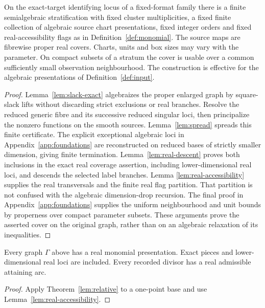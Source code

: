 \begin{theorem}\label{lem:relative}
On the exact-target identifying locus of a fixed-format family there is
a finite semialgebraic stratification with fixed cluster multiplicities,
a fixed finite collection of algebraic source chart presentations, fixed
integer orders and fixed real-accessibility flags as in
Definition~\ref{def:monomial}. The source maps are fibrewise proper real
covers. Charts, units and box sizes may vary with the parameter. On
compact subsets of a stratum the cover is usable over a common
sufficiently small observation neighbourhood. The construction is
effective for the algebraic presentations of Definition~\ref{def:input}.
\end{theorem}
\begin{proof}
Lemma~\ref{lem:slack-exact} algebraizes the proper enlarged graph by
square-slack lifts without discarding strict exclusions or real branches.
Resolve the reduced generic fibre and its successive reduced singular
loci, then principalize the nonzero functions on the smooth sources.
Lemma~\ref{lem:spread} spreads this finite certificate. The explicit
exceptional algebraic loci in Appendix~\ref{app:foundations} are
reconstructed on reduced bases of strictly smaller dimension, giving
finite termination. Lemma~\ref{lem:real-descent} proves both inclusions
in the exact real coverage assertion, including lower-dimensional real
loci, and descends the selected label branches. Lemma
\ref{lem:real-accessibility} supplies the real transversals and the finite
real flag partition. That partition is not confused with the algebraic
dimension-drop recursion. The final proof in
Appendix~\ref{app:foundations} supplies the uniform neighbourhood and
unit bounds by properness over compact parameter subsets. These
arguments prove the asserted cover on the original graph, rather than
on an algebraic relaxation of its inequalities.
\end{proof}

\begin{proposition}\label{prop:real-cover}
Every graph $\Gamma$ above has a real monomial presentation. Exact
pieces and lower-dimensional real loci are included. Every recorded
divisor has a real admissible attaining arc.
\end{proposition}
\begin{proof}
Apply Theorem~\ref{lem:relative} to a one-point base and use
Lemma~\ref{lem:real-accessibility}.
\end{proof}


